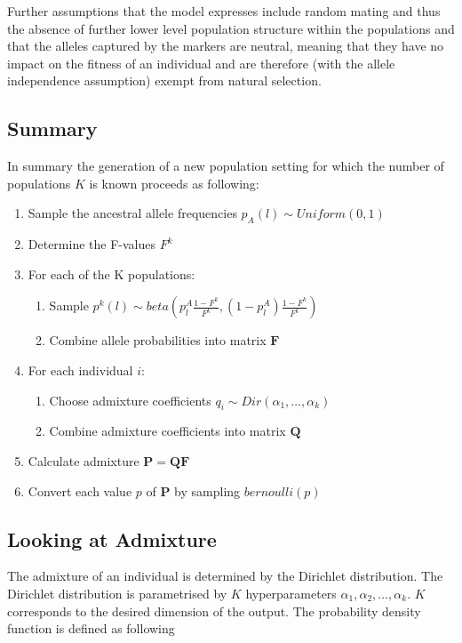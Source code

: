 \documentclass[a4paper, 11pt]{article}
\begin{document}
Further assumptions that the model expresses include random mating and thus the absence of further lower level population structure within the populations and that the alleles captured by the markers are neutral, meaning that they have no impact on the fitness of an individual and are therefore (with the allele independence assumption) exempt from natural selection.

\subsection{Summary}
In summary the generation of a new population setting for which the number of populations $K$ is known proceeds as following:
\begin{enumerate}
\item Sample the ancestral allele frequencies $p_A(l) \sim Uniform(0, 1)$
\item Determine the F-values $F^k$
\item  For each of the K populations:
\begin{enumerate}
\item Sample $p^k(l) \sim beta(p^{A}_{l} \frac{1 - F^k}{F^k}, (1-p^{A}_{l}) \frac{1 - F^k}{F^k})$
\item Combine allele probabilities into matrix $\mathbf{F}$
\end{enumerate} 
\item For each individual $i$:
\begin{enumerate}
\item Choose admixture coefficients $q_i \sim Dir(\alpha_1, \ldots, \alpha_k)$
\item Combine admixture coefficients into matrix $\mathbf{Q}$
\end{enumerate}
\item Calculate admixture $\mathbf{P} = \mathbf{Q}\mathbf{F}$
\item Convert each value $p$ of $\mathbf{P}$ by sampling $bernoulli(p)$
\end{enumerate}

\subsection{Looking at Admixture}
The admixture of an individual is determined by the Dirichlet distribution. The Dirichlet distribution is parametrised by $K$ hyperparameters $\alpha_1,\alpha_2, \ldots, \alpha_k$. $K$ corresponds to the desired dimension of the output. The probability density function is defined as following
\end{document}
